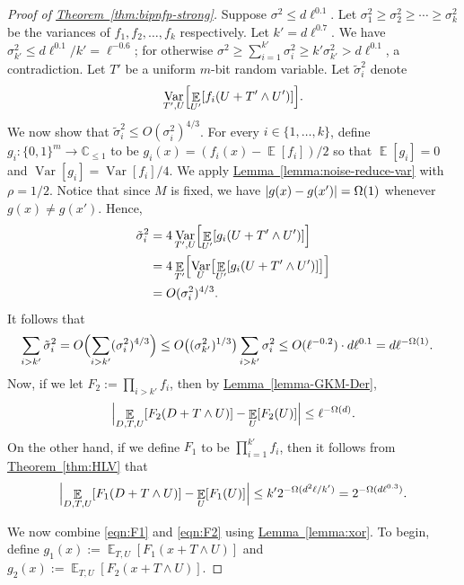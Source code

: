 \documentclass[11pt]{article}
\numberwithin{equation}{section}
\theoremstyle{definition}
\theoremstyle{plain}
\newcommand{\C}{\mathbb C}
\newcommand{\expref}[2]{\hyperref[#2]{#1~\ref{#2}}}
\newcommand{\zo}{\{0,1\}}
\def\Blocklength{\ell}
\DeclarePairedDelimiter{\abs}{\lvert}{\rvert}
\DeclareMathOperator*{\E}{\mathbb{E}}                 %
\DeclareMathOperator*{\Var}{Var}                 %
\begin{document}
\begin{proof}[Proof of {\expref{Theorem}{thm:bipnfp-strong}}]
    Suppose $\sigma^2 \le d\Blocklength^{0.1}$.
    Let $\sigma_1^2 \ge \sigma_2^2 \ge \cdots \ge \sigma_k^2$ be the variances of $f_1, f_2, \ldots, f_k$ respectively.
    Let $k' = d\Blocklength^{0.7}$.
    We have $\sigma_{k'}^2 \le d\Blocklength^{0.1} / k' = \Blocklength^{-0.6}$; for otherwise $\sigma^2 \ge \sum_{i=1}^{k'} \sigma_i^2 \ge k' \sigma_{k'}^2 > d\Blocklength^{0.1}$, a contradiction.
    Let $T'$ be a 
    uniform $m$-bit random variable.  
%
    Let $\tilde \sigma_i^2$ denote 
    \[
      \Var_{T',U} \Bigl[ \E_{U'} [f_i(U + T' \wedge U')] \Bigr] .
    \]
    We now show that $\tilde \sigma_i^2 \le O(\sigma_i^2)^{4/3}$.
    For every $i \in \{1, \ldots, k\}$, define $g_i\colon \zo^m \to \C_{\le 1}$ to be $g_i(x) = (f_i(x) - \E[f_i])/2$ so that $\E[g_i] = 0$ and $\Var[g_i] = \Var[f_i]/4$.
    We apply \expref{Lemma}{lemma:noise-reduce-var} with $\rho = 1/2$.
    Notice that since $M$ is fixed, we have $\abs{g(x) - g(x')} = \Omega(1)$ whenever $g(x) \neq g(x')$.
    Hence,
    \begin{align*}
      \tilde \sigma_i^2
      &= 4 \Var_{T',U} \Bigl[ \E_{U'} [g_i(U + T' \wedge U')] \Bigr] \\
      &= 4 \E_{T'} \Bigl[ \Var_U \bigl[ \E_{U'} [g_i(U + T' \wedge U')] \bigr] \Bigr] \\
      &= O(\sigma_i^2)^{4/3} .
    \end{align*}
    It follows that
    \begin{align*}
      \sum_{i > k'} \tilde \sigma_i^2
      &= O \Bigl( \sum_{i > k'} (\sigma_i^2)^{4/3} \Bigr)
      \le O\bigl( (\sigma_{k'}^2)^{1/3} \bigr) \sum_{i > k'} \sigma_i^2
      \le O(\Blocklength^{-0.2}) \cdot d\Blocklength^{0.1} = d \Blocklength^{-\Omega(1)}.
    \end{align*}
    Now, if we let $F_2 := \prod_{i > k'} f_i$, then by \expref{Lemma}{lemma-GKM-Der}, 
    \begin{align}
      \Bigl| \E_{D,T,U} [ F_2(D+T \wedge U) ] - \E_U[F_2(U)] \Bigr|
      \le \Blocklength^{-\Omega(d)} . \label{eqn:F1}
    \end{align}
    On the other hand, if we define $F_1$ to be $\prod_{i=1}^{k'} f_i$, then it follows from \expref{Theorem}{thm:HLV} that
    \begin{align}
      \Bigl| \E_{D,T,U} [ F_1(D + T \wedge U) ] - \E_U[F_1(U)] \Bigr|
      \le k' 2^{-\Omega(d^2 \Blocklength/k')}
      = 2^{-\Omega(d \Blocklength^{0.3})} . \label{eqn:F2}
    \end{align}

    We now combine \eqref{eqn:F1} and \eqref{eqn:F2} using \expref{Lemma}{lemma:xor}.
    To begin, define $g_1(x) := \E_{T,U}[F_1(x + T \wedge U)]$ and $g_2(x) := \E_{T,U}[F_2(x + T \wedge U)]$.


\end{proof}
\end{document}
